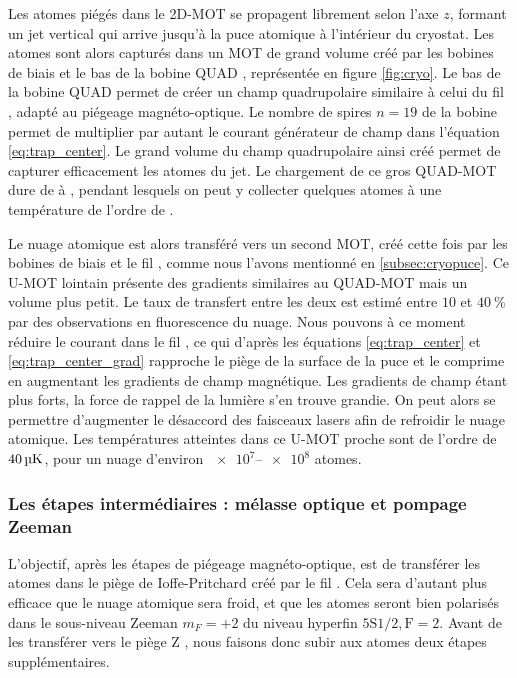Les atomes piégés dans le 2D-MOT se propagent librement selon l'axe $z$, formant un jet vertical qui arrive jusqu'à la puce atomique à l'intérieur du cryostat.
Les atomes sont alors capturés dans un MOT de grand volume créé par les bobines de biais et le bas de la bobine \og QUAD \fg{}, représentée en figure \eqref{fig:cryo}.
Le bas de la bobine QUAD permet de créer un champ quadrupolaire similaire à celui du fil , adapté au piégeage magnéto-optique.
Le nombre de spires $n=19$ de la bobine permet de multiplier par autant le courant générateur de champ dans l'équation \eqref{eq:trap_center}.
Le grand volume du champ quadrupolaire ainsi créé permet de capturer efficacement les atomes du jet.
Le chargement de ce gros \og QUAD-MOT \fg{} dure de  à , pendant lesquels on peut y collecter quelques  atomes à une température de l'ordre de .

Le nuage atomique est alors transféré vers un second MOT, créé cette fois par les bobines de biais et le fil , comme nous l'avons mentionné en \ref{subsec:cryopuce}.
Ce \og U-MOT lointain\fg{} présente des gradients similaires au QUAD-MOT mais un volume plus petit.
Le taux de transfert entre les deux est estimé entre $\num{10}$ et $\SI{40}{\percent}$ par des observations en fluorescence du nuage.
Nous pouvons à ce moment réduire le courant dans le fil , ce qui d'après les équations \eqref{eq:trap_center} et \eqref{eq:trap_center_grad} rapproche le piège de la surface de la puce et le comprime en augmentant les gradients de champ magnétique.
Les gradients de champ étant plus forts, la force de rappel de la lumière s'en trouve grandie.
On peut alors se permettre d'augmenter le désaccord des faisceaux lasers afin de refroidir le nuage atomique.
Les températures atteintes dans ce \og U-MOT proche\fg{} sont de l'ordre de $\SI{40}{\si{\micro\kelvin}}$, pour un nuage d'environ $\numrange{e7}{e8}$ atomes.

	\subsubsection*{Les étapes intermédiaires : mélasse optique et pompage Zeeman}
\noindent L'objectif, après les étapes de piégeage magnéto-optique, est de transférer les atomes dans le piège de Ioffe-Pritchard créé par le fil .
Cela sera d'autant plus efficace que le nuage atomique sera froid, et que les atomes seront bien polarisés dans le sous-niveau Zeeman $m_F=+2$ du niveau hyperfin $\mathrm{5S1/2,F=2}$.
Avant de les transférer vers le \og piège Z \fg{}, nous faisons donc subir aux atomes deux étapes supplémentaires.

